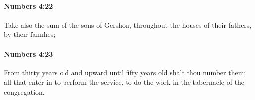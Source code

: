 		\paragraph{Numbers 4:22} %
			\label{NUMBERS-4-22}

			Take also the sum of the sons of Gershon, throughout the houses of their fathers, by their families;


		\paragraph{Numbers 4:23} %
			\label{NUMBERS-4-23}

			From thirty years old and upward until fifty years old shalt thou number them; all that enter in to perform the service, to do the work in the tabernacle of the congregation.


